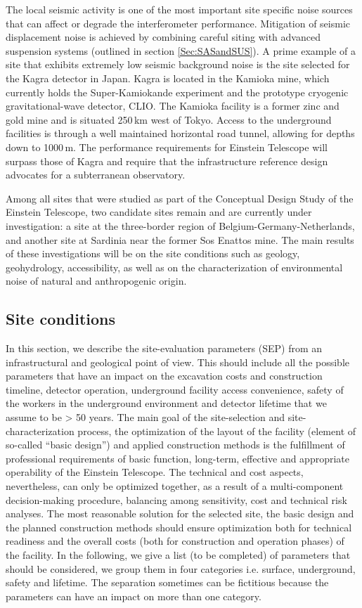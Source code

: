 The local seismic activity is one of the most important site specific noise sources that can affect or degrade the interferometer performance. Mitigation of seismic displacement noise is achieved by combining careful siting with advanced suspension systems (outlined in section \ref{Sec:SASandSUS}). A prime example of a site that exhibits extremely low seismic background noise is the site selected for the Kagra detector in Japan. Kagra is located in the Kamioka mine, which currently holds the Super-Kamiokande experiment and the prototype cryogenic gravitational-wave detector, CLIO. The Kamioka facility is a former zinc and gold mine and is situated 250\,km west of Tokyo. Access to the underground facilities is through a well maintained horizontal road tunnel, allowing for depths down to 1000\,m. The performance requirements for Einstein Telescope will surpass those of Kagra and require that the infrastructure reference design advocates for a subterranean observatory. 

Among all sites that were studied as part of the Conceptual Design Study of the Einstein Telescope, two candidate sites remain and are currently under investigation: a site at the three-border region of Belgium-Germany-Netherlands, and another site at Sardinia near the former Sos Enattos mine. The main results of these investigations will be on the site conditions such as geology, geohydrology, accessibility, as well as on the characterization of environmental noise of natural and anthropogenic origin.

\subsection{Site conditions}
In this section, we describe the site-evaluation parameters (SEP) from an infrastructural and geological point of view. This should include all the possible parameters that have an impact on the excavation costs and construction timeline, detector operation, underground facility access convenience, safety of the workers in the underground environment and detector lifetime that we assume to be > 50 years.
The main goal of the site-selection and site-characterization process, the optimization of the layout of the facility (element of so-called “basic design”) and applied construction methods is the fulfillment of professional requirements of basic function, long-term, effective and appropriate operability of the Einstein Telescope. The technical and cost aspects, nevertheless, can only be optimized together, as a result of a multi-component decision-making procedure, balancing among sensitivity, cost and technical risk analyses. The most reasonable solution for the selected site, the basic design and the planned construction methods should ensure optimization both for technical readiness and the overall costs (both for construction and operation phases) of the facility. 
In the following, we give a list (to be completed) of parameters that should be considered, we group them in four categories i.e. surface, underground, safety and lifetime. The separation sometimes can be fictitious because the parameters can have an impact on more than one category. 

